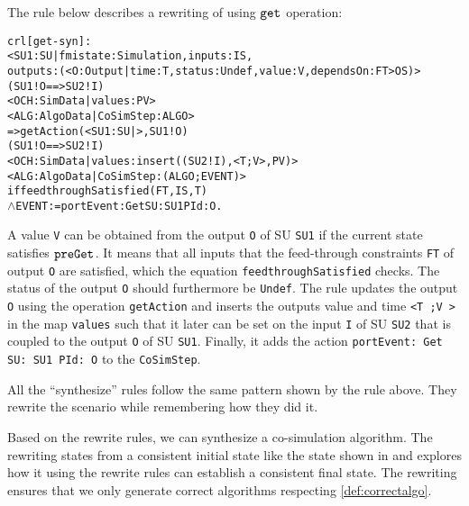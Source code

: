 The rule below describes a rewriting of using $\mathtt{get}_{}$ operation:
\small
\begin{alltt}
crl [get-syn] :
< SU1 : SU | fmistate : Simulation, inputs : IS, 
  outputs : (< O : Output | time : T, status : Undef, value : V, dependsOn : FT > OS) > 
(SU1 ! O ==> SU2 ! I)
< OCH : SimData | values : PV > 
< ALG : AlgoData | CoSimStep : ALGO >
=> getAction(< SU1 : SU | >, SU1 ! O)
  (SU1 ! O ==> SU2 ! I)
  < OCH : SimData | values : insert((SU2 ! I), < T ; V >, PV) >  
  < ALG : AlgoData | CoSimStep : (ALGO ; EVENT) >
if feedthroughSatisfied(FT, IS, T)
\(\land\) EVENT := portEvent: Get SU: SU1 PId: O . 
\end{alltt}
\normalsize
A value \texttt{V} can be obtained from the output \texttt{O} of SU \texttt{SU1} if the current state satisfies $\mathtt{preGet}_{}$.
It means that all inputs that the feed-through constraints \texttt{FT} of output \texttt{O} are satisfied, which the equation \texttt{feedthroughSatisfied} checks.
The status of the output \texttt{O} should furthermore be \texttt{Undef}.
The rule updates the output \texttt{O} using the operation \texttt{getAction} and inserts the outputs value and time \texttt{<T ;V >} in the map \texttt{values} such that it later can be set on the input \texttt{I} of SU \texttt{SU2} that is coupled to the output \texttt{O} of SU \texttt{SU1}.
Finally, it adds the action \texttt{portEvent: Get SU: SU1 PId: O} to the \texttt{CoSimStep}.

All the ``synthesize'' rules follow the same pattern shown by the rule above.
They rewrite the scenario while remembering how they did it.

Based on the rewrite rules, we can synthesize a co-simulation algorithm.
The rewriting states from a consistent initial state like the state shown in  and explores how it using the rewrite rules can establish a consistent final state.
The rewriting ensures that we only generate correct algorithms respecting \cref{def:correctalgo}.  

